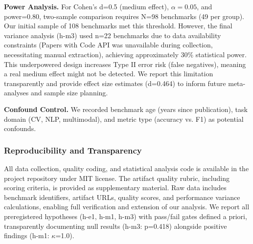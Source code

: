 \textbf{Power Analysis.} For Cohen's d=0.5 (medium effect), $\alpha =0.05$, and power=0.80, two-sample comparison requires N=98 benchmarks (49 per group). Our initial sample of 108 benchmarks met this threshold. However, the final variance analysis (h-m3) used n=22 benchmarks due to data availability constraints (Papers with Code API was unavailable during collection, necessitating manual extraction), achieving approximately 30\% statistical power. This underpowered design increases Type II error risk (false negatives), meaning a real medium effect might not be detected. We report this limitation transparently and provide effect size estimates (d=0.464) to inform future meta-analyses and sample size planning.

\textbf{Confound Control.} We recorded benchmark age (years since publication), task domain (CV, NLP, multimodal), and metric type (accuracy vs. F1) as potential confounds.

\subsubsection{Reproducibility and Transparency}

All data collection, quality coding, and statistical analysis code is available in the project repository under MIT license. The artifact quality rubric, including scoring criteria, is provided as supplementary material. Raw data includes benchmark identifiers, artifact URLs, quality scores, and performance variance calculations, enabling full verification and extension of our analysis. We report all preregistered hypotheses (h-e1, h-m1, h-m3) with pass/fail gates defined a priori, transparently documenting null results (h-m3: p=0.418) alongside positive findings (h-m1: $\kappa$=1.0).
